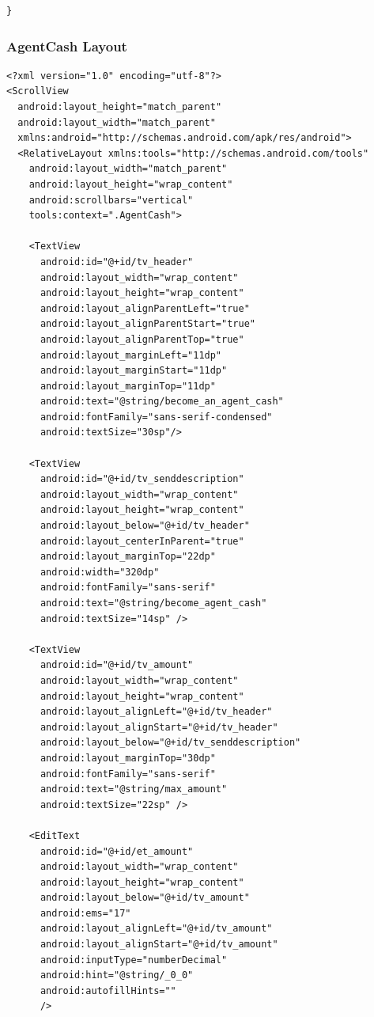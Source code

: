 \documentclass[11pt, a4paper]{article}
\begin{document}
\begin{appendices}
\begin{lstlisting}
}
\end{lstlisting}
\subsubsection{AgentCash Layout}
\begin{lstlisting}
<?xml version="1.0" encoding="utf-8"?>
<ScrollView
  android:layout_height="match_parent"
  android:layout_width="match_parent"
  xmlns:android="http://schemas.android.com/apk/res/android">
  <RelativeLayout xmlns:tools="http://schemas.android.com/tools"
    android:layout_width="match_parent"
    android:layout_height="wrap_content"
    android:scrollbars="vertical"
    tools:context=".AgentCash">

    <TextView
      android:id="@+id/tv_header"
      android:layout_width="wrap_content"
      android:layout_height="wrap_content"
      android:layout_alignParentLeft="true"
      android:layout_alignParentStart="true"
      android:layout_alignParentTop="true"
      android:layout_marginLeft="11dp"
      android:layout_marginStart="11dp"
      android:layout_marginTop="11dp"
      android:text="@string/become_an_agent_cash"
      android:fontFamily="sans-serif-condensed"
      android:textSize="30sp"/>

    <TextView
      android:id="@+id/tv_senddescription"
      android:layout_width="wrap_content"
      android:layout_height="wrap_content"
      android:layout_below="@+id/tv_header"
      android:layout_centerInParent="true"
      android:layout_marginTop="22dp"
      android:width="320dp"
      android:fontFamily="sans-serif"
      android:text="@string/become_agent_cash"
      android:textSize="14sp" />

    <TextView
      android:id="@+id/tv_amount"
      android:layout_width="wrap_content"
      android:layout_height="wrap_content"
      android:layout_alignLeft="@+id/tv_header"
      android:layout_alignStart="@+id/tv_header"
      android:layout_below="@+id/tv_senddescription"
      android:layout_marginTop="30dp"
      android:fontFamily="sans-serif"
      android:text="@string/max_amount"
      android:textSize="22sp" />

    <EditText
      android:id="@+id/et_amount"
      android:layout_width="wrap_content"
      android:layout_height="wrap_content"
      android:layout_below="@+id/tv_amount"
      android:ems="17"
      android:layout_alignLeft="@+id/tv_amount"
      android:layout_alignStart="@+id/tv_amount"
      android:inputType="numberDecimal"
      android:hint="@string/_0_0"
      android:autofillHints=""
      />


\end{lstlisting}
\end{appendices}
\end{document}
